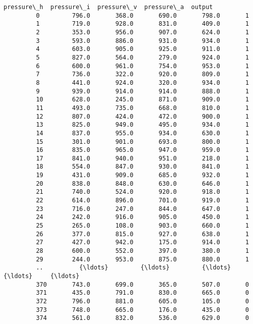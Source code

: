 \documentclass[11pt]{article}
\begin{document}
\begin{Verbatim}[commandchars=\\\{\}]
              pressure\_h  pressure\_i  pressure\_v  pressure\_a  output  
         0         796.0       368.0       690.0       798.0       1  
         1         719.0       928.0       831.0       409.0       1  
         2         353.0       956.0       907.0       624.0       1  
         3         593.0       886.0       931.0       934.0       1  
         4         603.0       905.0       925.0       911.0       1  
         5         827.0       564.0       279.0       924.0       1  
         6         600.0       961.0       754.0       953.0       1  
         7         736.0       322.0       920.0       809.0       1  
         8         441.0       924.0       320.0       934.0       1  
         9         939.0       914.0       914.0       888.0       1  
         10        628.0       245.0       871.0       909.0       1  
         11        493.0       735.0       668.0       810.0       1  
         12        807.0       424.0       472.0       900.0       1  
         13        825.0       949.0       495.0       934.0       1  
         14        837.0       955.0       934.0       630.0       1  
         15        301.0       901.0       693.0       800.0       1  
         16        835.0       965.0       947.0       959.0       1  
         17        841.0       940.0       951.0       218.0       1  
         18        554.0       847.0       930.0       841.0       1  
         19        431.0       909.0       685.0       932.0       1  
         20        838.0       848.0       630.0       646.0       1  
         21        740.0       524.0       920.0       918.0       1  
         22        614.0       896.0       701.0       919.0       1  
         23        716.0       247.0       844.0       647.0       1  
         24        242.0       916.0       905.0       450.0       1  
         25        265.0       108.0       903.0       660.0       1  
         26        377.0       815.0       927.0       638.0       1  
         27        427.0       942.0       175.0       914.0       1  
         28        600.0       552.0       397.0       380.0       1  
         29        244.0       953.0       875.0       880.0       1  
         ..          {\ldots}         {\ldots}         {\ldots}         {\ldots}     {\ldots}  
         370       743.0       699.0       365.0       507.0       0  
         371       435.0       791.0       830.0       665.0       0  
         372       796.0       881.0       605.0       105.0       0  
         373       748.0       665.0       176.0       435.0       0  
         374       561.0       832.0       536.0       629.0       0  

\end{Verbatim}
\end{document}
